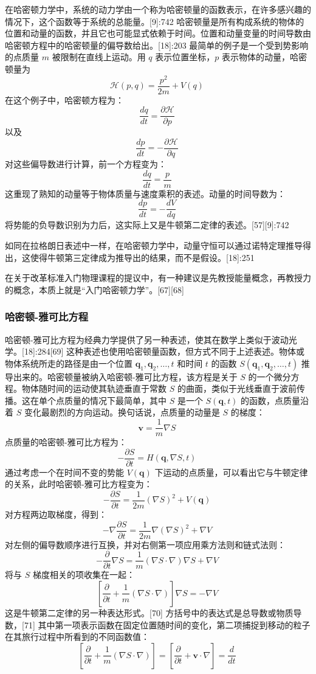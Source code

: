 在哈密顿力学中，系统的动力学由一个称为哈密顿量的函数表示，在许多感兴趣的情况下，这个函数等于系统的总能量。[9]:742 哈密顿量是所有构成系统的物体的位置和动量的函数，并且它也可能显式依赖于时间。位置和动量变量的时间导数由哈密顿方程中的哈密顿量的偏导数给出。[18]:203 最简单的例子是一个受到势影响的点质量 \( m \) 被限制在直线上运动。用 \( q \) 表示位置坐标，\( p \) 表示物体的动量，哈密顿量为
\[
{\mathcal {H}}(p,q) = \frac{p^2}{2m} + V(q)~
\]
在这个例子中，哈密顿方程为：
\[
\frac{dq}{dt} = \frac{\partial {\mathcal {H}}}{\partial p}~
\]
以及
\[
\frac{dp}{dt} = -\frac{\partial {\mathcal {H}}}{\partial q}~
\]
对这些偏导数进行计算，前一个方程变为：
\[
\frac{dq}{dt} = \frac{p}{m}~
\]
这重现了熟知的动量等于物体质量与速度乘积的表述。动量的时间导数为：
\[
\frac{dp}{dt} = -\frac{dV}{dq}~
\]
将势能的负导数识别为力后，这实际上又是牛顿第二定律的表述。[57][9]:742

如同在拉格朗日表述中一样，在哈密顿力学中，动量守恒可以通过诺特定理推导得出，这使得牛顿第三定律成为推导出的结果，而不是假设。[18]:251

在关于改革标准入门物理课程的提议中，有一种建议是先教授能量概念，再教授力的概念，本质上就是“入门哈密顿力学”。[67][68]
\subsubsection{哈密顿-雅可比方程}
哈密顿-雅可比方程为经典力学提供了另一种表述，使其在数学上类似于波动光学。[18]:284[69] 这种表述也使用哈密顿量函数，但方式不同于上述表述。物体或物体系统所走的路径是由一个位置 \( \mathbf{q}_1, \mathbf{q}_2, \ldots, t \) 和时间 \( t \) 的函数 \( S(\mathbf{q}_1, \mathbf{q}_2, \ldots, t) \) 推导出来的。哈密顿量被纳入哈密顿-雅可比方程，该方程是关于 \( S \) 的一个微分方程。物体随时间的运动使其轨迹垂直于常数 \( S \) 的曲面，类似于光线垂直于波前传播。这在单个点质量的情况下最简单，其中 \( S \) 是一个 \( S(\mathbf{q}, t) \) 的函数，点质量沿着 \( S \) 变化最剧烈的方向运动。换句话说，点质量的动量是 \( S \) 的梯度：
\[
\mathbf{v} = \frac{1}{m} \nabla S~
\]
点质量的哈密顿-雅可比方程为：
\[
-\frac{\partial S}{\partial t} = H\left(\mathbf{q}, \nabla S, t\right)~
\]
通过考虑一个在时间不变的势能 \( V(\mathbf{q}) \) 下运动的点质量，可以看出它与牛顿定律的关系，此时哈密顿-雅可比方程变为：
\[
-\frac{\partial S}{\partial t} = \frac{1}{2m} \left(\nabla S\right)^2 + V(\mathbf{q})~
\]
对方程两边取梯度，得到：
\[
-\nabla \frac{\partial S}{\partial t} = \frac{1}{2m} \nabla \left(\nabla S\right)^2 + \nabla V~
\]
对左侧的偏导数顺序进行互换，并对右侧第一项应用乘方法则和链式法则：
\[
-\frac{\partial}{\partial t} \nabla S = \frac{1}{m} \left(\nabla S \cdot \nabla \right) \nabla S + \nabla V~
\]
将与 \( S \) 梯度相关的项收集在一起：
\[
\left[\frac{\partial}{\partial t} + \frac{1}{m} \left(\nabla S \cdot \nabla \right)\right] \nabla S = - \nabla V~
\]
这是牛顿第二定律的另一种表达形式。[70] 方括号中的表达式是总导数或物质导数，[71] 其中第一项表示函数在固定位置随时间的变化，第二项捕捉到移动的粒子在其旅行过程中所看到的不同函数值：
\[
\left[\frac{\partial}{\partial t} + \frac{1}{m} \left(\nabla S \cdot \nabla \right)\right] = \left[\frac{\partial}{\partial t} + \mathbf{v} \cdot \nabla \right] = \frac{d}{dt}~
\]
